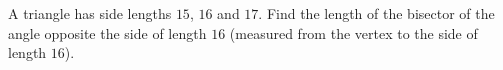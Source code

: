 A triangle has side lengths $15$, $16$ and $17$. Find the length of the bisector of the angle opposite the side of length $16$ (measured from the vertex to the side of length $16$).

